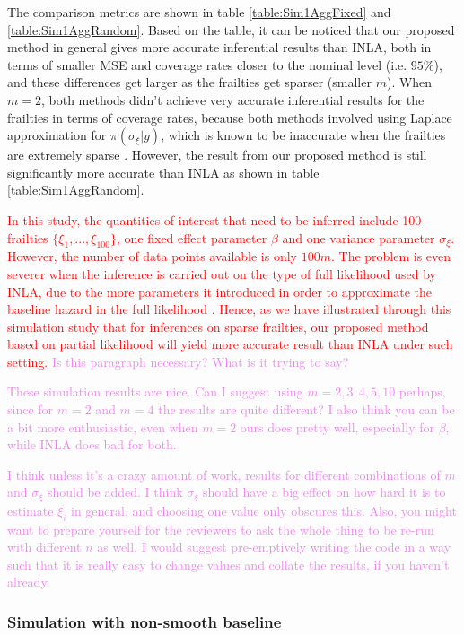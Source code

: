\documentclass[ba]{imsart}
\newcommand{\highlight}[1]{\textcolor{red}{#1}}
\newcommand{\alex}[1]{\textcolor{violet}{{ }#1}}
\begin{document}
The comparison metrics are shown in table \ref{table:Sim1AggFixed} and \ref{table:Sim1AggRandom}. Based on the table, it can be noticed that our proposed method in general gives more accurate inferential results than INLA, both in terms of smaller MSE and coverage rates closer to the nominal level (i.e. $95\%$), and these differences get larger as the frailties get sparser (smaller $m$). When $m = 2$, both methods didn't achieve very accurate inferential results for the frailties in terms of coverage rates, because both methods involved using Laplace approximation for $\pi(\sigma_\xi|y)$, which is known to be inaccurate when the frailties are extremely sparse \citep{Ogden2013ASR}. However, the result from our proposed method is still significantly more accurate than INLA as shown in table \ref{table:Sim1AggRandom}.

\highlight{In this study, the quantities of interest that need to be inferred include 100 frailties $\{\xi_1,...,\xi_{100}\}$, one fixed effect parameter $\beta$ and one variance parameter $\sigma_\xi$. However, the number of data points available is only $100m$. The problem is even severer when the inference is carried out on the type of full likelihood used by INLA, due to the more parameters it introduced in order to approximate the baseline hazard in the full likelihood \citep{coxdiscussion}. Hence, as we have illustrated through this simulation study that for inferences on sparse frailties, our proposed method based on partial likelihood will yield more accurate result than INLA under such setting.}\alex{Is this paragraph necessary? What is it trying to say?}

\alex{These simulation results are nice. Can I suggest using $m=2,3,4,5,10$ perhaps, since for $m=2$ and $m=4$ the results are quite different? I also think you can be a bit more enthusiastic, even when $m=2$ ours does pretty well, especially for $\beta$, while INLA does bad for both.}

\alex{I think unless it's a crazy amount of work, results for different combinations of $m$ and $\sigma_{\xi}$ should be added. I think $\sigma_{\xi}$ should have a big effect on how hard it is to estimate $\xi_{i}$ in general, and choosing one value only obscures this. Also, you might want to prepare yourself for the reviewers to ask the whole thing to be re-run with different $n$ as well. I would suggest pre-emptively writing the code in a way such that it is really easy to change values and collate the results, if you haven't already.}

\subsubsection{Simulation with non-smooth baseline}\label{subsubsec:sim2}
\end{document}
